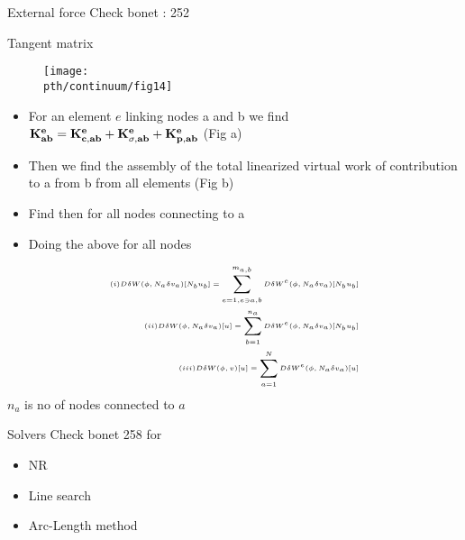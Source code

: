  
 	\begin{frame}{External force}
 		Check bonet : 252
 	\end{frame}
 
 
 	\begin{frame}{Tangent matrix}
		\begin{figure}
 			\centering
 			\texttt{[image: \\pth/continuum/fig14]} 
 		\end{figure}
	 	\begin{itemize}
			\item For an element $e$ linking nodes a and b we find $\mathbf{K_{ab}^e = K_{c,ab}^e + K_{\sigma,ab}^e + K_{p,ab}^e}$  (Fig a)
	 		\item Then we find the assembly of the total linearized virtual work of contribution to a from b from all elements (Fig b)
	 		\item Find then for all nodes connecting to a
	 		\item Doing the above for all nodes
	 	\end{itemize}
 	
 	\begin{equation}
 	\tiny
 		\begin{aligned}
 		(i) D\delta W(\phi,N_a\delta v_a)[N_bu_b] = \sum_{e=1,e \ni a,b}^{m_{a,b}} D\delta W^e(\phi,N_a \delta v_a)[N_b u_b]\\
 		(ii)  D\delta W(\phi,N_a\delta v_a)[u] = \sum_{b=1}^{n_a} D\delta W^e(\phi,N_a \delta v_a)[N_b u_b]\\
 		(iii)  D\delta W(\phi,v)[u] = \sum_{a=1}^{N} D\delta W^e(\phi,N_a \delta v_a)[u]\\
 		\end{aligned}
 	\end{equation}
 	$n_a$ is no of nodes connected to $a$
 	\end{frame}
 
 	
 	\begin{frame}{Solvers}
 		Check bonet 258 for 
 		\begin{itemize}
 			\item NR
 			\item Line search
 			\item Arc-Length method 			
 		\end{itemize}
 	\end{frame}